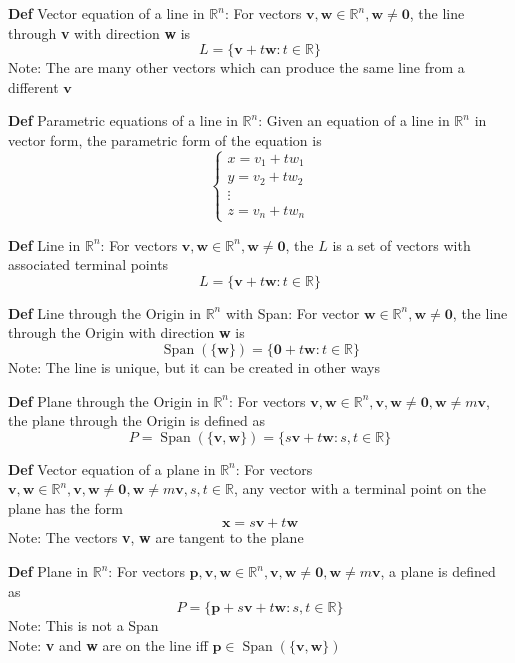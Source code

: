 \documentclass[11pt,notitlepage]{report}
\newcommand{\bb}[1]{\ensuremath{\mathbb{#1}}}
\newcommand{\tbf}[1]{\textbf{#1}}
\begin{document}
\textbf{Def} Vector equation of a line in $\bb R^n$: For vectors $\tbf v, \tbf w \in \bb R^n, \tbf w \ne \tbf 0$, the line through \tbf v with direction \tbf w is
$$L = \{\tbf v + t \tbf w: t \in \bb R\}$$
\hspace*{5mm} Note: The are many other vectors which can produce the same line from a different $\tbf v$

\textbf{Def} Parametric equations of a line in $\bb R^n$: Given an equation of a line in $\bb R^n$ in vector form, the parametric form of the equation is
$$\begin{cases} x = v_1 + tw_1\\ y = v_2 + tw_2\\ \vdots\\ z = v_n + tw_n
\end{cases}$$

\textbf{Def} Line in $\bb R^n$: For vectors $\tbf v, \tbf w \in \bb R^n, \tbf w \ne \tbf 0$, the $L$ is a set of vectors with associated terminal points
$$L = \{\tbf v + t \tbf w : t \in \bb R\}$$


\textbf{Def} Line through the Origin in $\bb R^n$ with Span: For vector $\tbf w \in \bb R^n, \tbf w \ne \tbf 0$, the line through the Origin with direction \tbf w is
$$\operatorname{Span}(\{\tbf w\}) = \{\tbf 0 + t \tbf w: t \in \bb R\}$$
\hspace*{5mm} Note: The line is unique, but it can be created in other ways


\textbf{Def} Plane through the Origin in $\bb R^n$: For vectors $\tbf v, \tbf w \in \bb R^n, \tbf v, \tbf w \ne \tbf 0, \tbf w \ne m\tbf v$, the plane through the Origin is defined as
$$P = \operatorname{Span}(\{\tbf v, \tbf w\}) = \{s \tbf v + t \tbf w: s, t \in \bb R\}$$

\textbf{Def} Vector equation of a plane in $\bb R^n$: For vectors $\tbf v, \tbf w \in \bb R^n, \tbf v, \tbf w \ne \tbf 0, \tbf w \ne m\tbf v, s, t \in \bb R$, any vector with a terminal point on the plane has the form
$$\tbf x = s \tbf v + t \tbf w$$
\hspace*{5mm} Note: The vectors \tbf v, \tbf w are tangent to the plane

\textbf{Def} Plane in $\bb R^n$: For vectors $\tbf p, \tbf v, \tbf w \in \bb R^n, \tbf v, \tbf w \ne \tbf 0, \tbf w \ne m\tbf v$, a plane is defined as
$$P = \{\tbf p + s \tbf v + t \tbf w: s, t \in \bb R\}$$
\hspace*{5mm} Note: This is not a Span\\
\hspace*{5mm} Note: \tbf v and \tbf w are on the line iff $\tbf p \in \operatorname{Span}(\{\tbf v, \tbf w\})$
\end{document}
